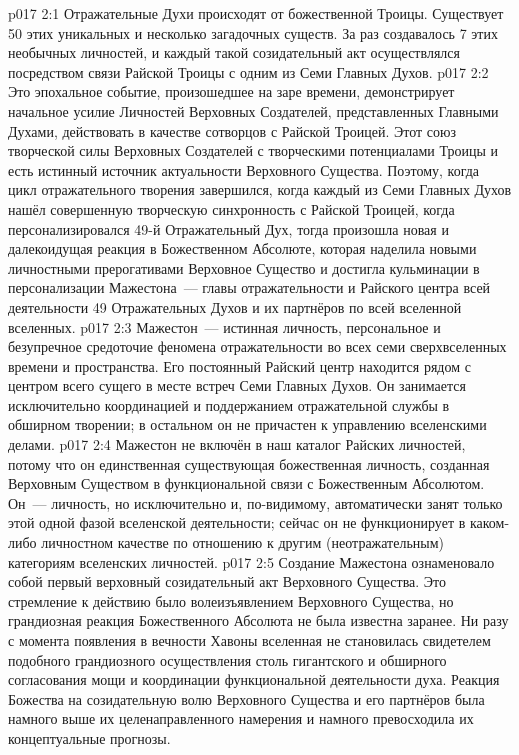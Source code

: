 \vs p017 2:1 Отражательные Духи происходят от божественной Троицы. Существует 50 этих уникальных и несколько загадочных существ. За раз создавалось 7 этих необычных личностей, и каждый такой созидательный акт осуществлялся посредством связи Райской Троицы с одним из Семи Главных Духов.
\vs p017 2:2 Это эпохальное событие, произошедшее на заре времени, демонстрирует начальное усилие Личностей Верховных Создателей, представленных Главными Духами, действовать в качестве сотворцов с Райской Троицей. Этот союз творческой силы Верховных Создателей с творческими потенциалами Троицы и есть истинный источник актуальности Верховного Существа. Поэтому, когда цикл отражательного творения завершился, когда каждый из Семи Главных Духов нашёл совершенную творческую синхронность с Райской Троицей, когда персонализировался 49\hyp{}й Отражательный Дух, тогда произошла новая и далекоидущая реакция в Божественном Абсолюте, которая наделила новыми личностными прерогативами Верховное Существо и достигла кульминации в персонализации Мажестона~--- главы отражательности и Райского центра всей деятельности 49 Отражательных Духов и их партнёров по всей вселенной вселенных.
\vs p017 2:3 Мажестон~--- истинная личность, персональное и безупречное средоточие феномена отражательности во всех семи сверхвселенных времени и пространства. Его постоянный Райский центр находится рядом с центром всего сущего в месте встреч Семи Главных Духов. Он занимается исключительно координацией и поддержанием отражательной службы в обширном творении; в остальном он не причастен к управлению вселенскими делами.
\vs p017 2:4 Мажестон не включён в наш каталог Райских личностей, потому что он единственная существующая божественная личность, созданная Верховным Существом в функциональной связи с Божественным Абсолютом. Он~--- личность, но исключительно и, по\hyp{}видимому, автоматически занят только этой одной фазой вселенской деятельности; сейчас он не функционирует в каком\hyp{}либо личностном качестве по отношению к другим (неотражательным) категориям вселенских личностей.
\vs p017 2:5 \pc Создание Мажестона ознаменовало собой первый верховный созидательный акт Верховного Существа. Это стремление к действию было волеизъявлением Верховного Существа, но грандиозная реакция Божественного Абсолюта не была известна заранее. Ни разу с момента появления в вечности Хавоны вселенная не становилась свидетелем подобного грандиозного осуществления столь гигантского и обширного согласования мощи и координации функциональной деятельности духа. Реакция Божества на созидательную волю Верховного Существа и его партнёров была намного выше их целенаправленного намерения и намного превосходила их концептуальные прогнозы.
